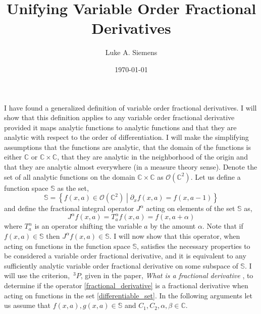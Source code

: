 \documentclass[%
 onecolumn,
 amsmath, amssymb, aps, pra, 10pt
]{revtex4-2}
\begin{document}
\title{Unifying Variable Order Fractional Derivatives}%
\author{Luke A. Siemens}
\noaffiliation
\date{\today}
\maketitle

I have found a generalized definition of variable order fractional derivatives. I will show that this definition applies to any variable order fractional derivative provided it maps analytic functions to analytic functions and that they are analytic with respect to the order of differentiation. I will make the simplifying assumptions that the functions are analytic, that the domain of the functions is either $\mathbb{C}$ or $\mathbb{C} \times \mathbb{C}$, that they are analytic in the neighborhood of the origin and that they are analytic almost everywhere (in a measure theory sense). Denote the set of all analytic functions on the domain $\mathbb{C} \times \mathbb{C}$ as $\mathcal{O}(\mathbb{C}^2)$. Let us define a function space $\mathbb{S}$ as the set,
\begin{equation}
\mathbb{S} = \left\lbrace f(x, a) \in \mathcal{O}(\mathbb{C}^2) \middle| \partial_x f(x, a) = f(x, a - 1) \right\rbrace
\label{differentiable_set}
\end{equation}
and define the fractional integral operator $J^{\alpha}$ acting on elements of the set $\mathbb{S}$ as,
\begin{equation}
J^{\alpha} f(x, a) = T_{a}^{\alpha} f(x, a) = f(x, a + \alpha)
\label{fractional_derivative}
\end{equation}
where $T_{a}^{\alpha}$ is an operator shifting the variable $a$ by the amount $\alpha$. Note that if $f(x, a) \in \mathbb{S}$ then $J^{\alpha} f(x, a) \in \mathbb{S}$. I will now show that this operator, when acting on functions in the function space $\mathbb{S}$, satisfies the necessary properties to be considered a variable order fractional derivative, and it is equivalent to any sufficiently analytic variable order fractional derivative on some subspace of $\mathbb{S}$.
I will use the criterion, $\,^3P$, given in the paper, \textit{What is a fractional derivative} \cite{ORTIGUEIRA20154}, to determine if the operator \eqref{fractional_derivative} is a fractional derivative when acting on functions in the set \eqref{differentiable_set}. In the following arguments let us assume that $f(x, a), g(x, a) \in \mathbb{S}$ and $C_1, C_2, \alpha, \beta \in \mathbb{C}$.
\end{document}
